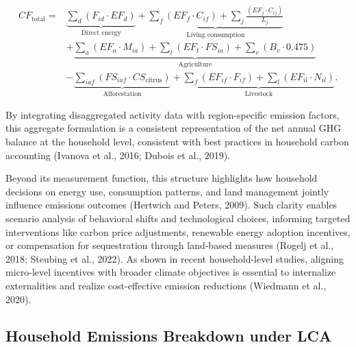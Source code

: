 \documentclass[12pt,a4paper]{article}%
\begin{document}
\begin{align}
CF_{\text{total}} = & \underbrace{\sum_d \left(F_{id} \cdot EF_d\right)}_{\text{Direct energy}} + 
\underbrace{\sum_f \left(EF_f \cdot C_{if}\right) + \sum_j \frac{\left(EF_j \cdot C_{ij}\right)}{L_j}}_{\text{Living consumption}} \nonumber \\
& + \underbrace{\sum_a \left(EF_a \cdot M_{ia}\right) + \sum_t \left(EF_t \cdot FS_{ia}\right) + \sum_v \left(B_v \cdot 0.475\right)}_{\text{Agriculture}} \nonumber \\
& - \underbrace{\sum_{iaf} \left(FS_{iaf} \cdot CS_{\text{citrus}}\right)}_{\text{Afforestation}} +
\underbrace{\sum_f \left(EF_{if} \cdot F_{if}\right) + \sum_l \left(EF_{il} \cdot N_{il}\right)}_{\text{Livestock}}.
\label{eq:aggregate}
\end{align}

By integrating disaggregated activity data with region-specific emission factors, this aggregate formulation is a consistent representation of the net annual GHG balance at the household level, consistent with best practices in household carbon accounting (Ivanova et al., 2016; Dubois et al., 2019). 

Beyond its measurement function, this structure highlights how household decisions on energy use, consumption patterns, and land management jointly influence emissions outcomes (Hertwich and Peters, 2009). Such clarity enables scenario analysis of behavioral shifts and technological choices, informing targeted interventions like carbon price adjustments, renewable energy adoption incentives, or compensation for sequestration through land-based measures (Rogelj et al., 2018; Steubing et al., 2022). As shown in recent household-level studies, aligning micro-level incentives with broader climate objectives is essential to internalize externalities and realize cost-effective emission reductions (Wiedmann et al., 2020).

\subsection{Household Emissions Breakdown under LCA}
\end{document}
